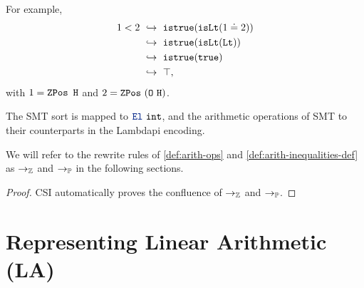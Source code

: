 \begin{example}
For example,
\begin{align*}
  1 < 2
  &\ \hookrightarrow\ \texttt{istrue}(\texttt{isLt}(1 \doteq 2)) \\
  &\ \hookrightarrow\ \texttt{istrue}(\texttt{isLt}(\texttt{Lt})) \\
  &\ \hookrightarrow\ \texttt{istrue}(\texttt{true}) \\
  &\ \hookrightarrow\ \top,
\end{align*}
with $1 = \mathop{\texttt{ZPos}}~\texttt{H}$ and $2 = \mathop{\texttt{ZPos}}~(\texttt{O}~\texttt{H})$.
\end{example}

The SMT sort  is mapped to $\el~\texttt{int}$, and the arithmetic operations of SMT to their counterparts in the Lambdapi encoding.

\begin{notation}
We will refer to the rewrite rules of \cref{def:arith-ops} and \cref{def:arith-inequalities-def} as $\ra_\Z$ \index{$\ra_\Z$} and $\rightarrow_\mathbb{P}$  in the following sections.
\end{notation}

\begin{lemma}
\begin{proof}
CSI \cite{CSI} automatically proves the confluence of $\rightarrow_\mathbb{Z}$ and $\rightarrow_\mathbb{P}$.
\end{proof}
\label{lemma:confluenceZP}
\end{lemma}

\section{Representing Linear Arithmetic (\textbf{LA})}
\label{ssec:encoding-la}

